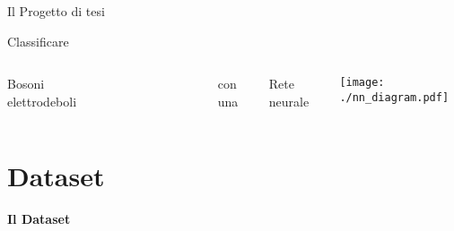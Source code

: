 \documentclass{beamer}
\begin{document}
\begin{frame}{Il Progetto di tesi}
%
%
  \vspace*{-3.5ex}
  \begin{center}
    \Large
    Classificare
  \end{center}
  \vspace*{-1.5ex}
  \begin{columns}[T]
      \begin{block}{}
        \centering%
        Bosoni elettrodeboli
      \end{block}
      \begin{figure}
        \centering
        
      \end{figure}
      \begin{flushleft}
        \vspace{-3ex}
        \scalebox{.4}{
          Adapted from: https://it.wikipedia.org/wiki/Modello\_standard
        }
      \end{flushleft}
      {
        \begin{block}{}
          \centering\small
          con una
        \end{block}
      }
      \begin{block}{}
        \centering
        Rete neurale
      \end{block}
      \parbox[t][][c]{\textwidth}{
        \vspace*{3ex}
        \centering
        \texttt{[image: ./nn\_diagram.pdf]}
      }
  \end{columns}
\end{frame}

\section{Dataset}
\begin{frame}
  \centering
  \Huge\bfseries
  Il Dataset
\end{frame}
\end{document}
